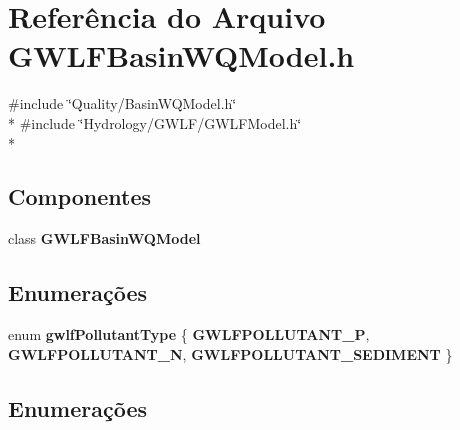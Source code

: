 \section{Referência do Arquivo G\+W\+L\+F\+Basin\+W\+Q\+Model.\+h}
\label{_g_w_l_f_basin_w_q_model_8h}
{\ttfamily \#include \char`\"{}Quality/\+Basin\+W\+Q\+Model.\+h\char`\"{}}\\*
{\ttfamily \#include \char`\"{}Hydrology/\+G\+W\+L\+F/\+G\+W\+L\+F\+Model.\+h\char`\"{}}\\*
\subsection*{Componentes}
\begin{DoxyCompactItemize}
\item 
class {\bf G\+W\+L\+F\+Basin\+W\+Q\+Model}
\end{DoxyCompactItemize}
\subsection*{Enumerações}
\begin{DoxyCompactItemize}
\item 
enum {\bf gwlf\+Pollutant\+Type} \{ {\bf G\+W\+L\+F\+P\+O\+L\+L\+U\+T\+A\+N\+T\+\_\+P}, 
{\bf G\+W\+L\+F\+P\+O\+L\+L\+U\+T\+A\+N\+T\+\_\+N}, 
{\bf G\+W\+L\+F\+P\+O\+L\+L\+U\+T\+A\+N\+T\+\_\+\+S\+E\+D\+I\+M\+E\+NT}
 \}
\end{DoxyCompactItemize}


\subsection{Enumerações}
